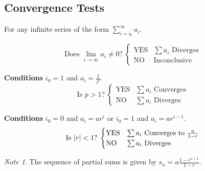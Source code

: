 \documentclass{article}
\theoremstyle{plain}
\numberwithin{theorem}{subsection}
\theoremstyle{definition}
\numberwithin{definition}{subsection}
\theoremstyle{remark}
\newtheorem{note}{Note}[section]
\numberwithin{note}{subsection}
\begin{document}
\subsection{Convergence Tests}
For any infinite series of the form $\displaystyle\sum_{i=i_0}^\infty a_i$.
\begin{multicols}{2}
    \begin{mdframed}[style=exampledefaultcols,frametitle={Divergence Test}]
        \begin{equation*}
            \text{Does $\lim_{i\to\infty}a_i\neq0$?}\:
            \begin{cases}
                \text{YES} & \text{$\sum a_i$ Diverges} \\
                \text{NO}  & \text{Inconclusive}
            \end{cases}
        \end{equation*}
    \end{mdframed}
    \begin{mdframed}[style=exampledefaultcols,frametitle={$p$-Series}]
        \textbf{Conditions} $i_0=1$ and $a_i = \frac{1}{i^p}$.
        \begin{equation*}
            \text{Is $p>1$?}\:
            \begin{cases}
                \text{YES} & \text{$\sum a_i$ Converges} \\
                \text{NO}  & \text{$\sum a_i$ Diverges}
            \end{cases}
        \end{equation*}
    \end{mdframed}
    \begin{mdframed}[style=exampledefaultcols,frametitle={Geometric Series}]
        \textbf{Conditions} $i_0=0$ and $a_i = a r^i$ or $i_0=1$ and $a_i = a r^{i-1}$.
        \begin{equation*}
            \text{Is $\abs{r}<1$?}\:
            \begin{cases}
                \text{YES} & \text{$\sum a_i$ Converges to $\frac{a}{1-r}$} \\
                \text{NO}  & \text{$\sum a_i$ Diverges}
            \end{cases}
        \end{equation*}
    \end{mdframed}
    \begin{note}
        The sequence of partial sums is given by $\displaystyle s_n=a\frac{1-r^{n+1}}{1-r}$.
    \end{note}
    \begin{mdframed}[style=exampledefaultcols,frametitle={Alternating Series}]

\end{mdframed}
\end{multicols}
\end{document}
